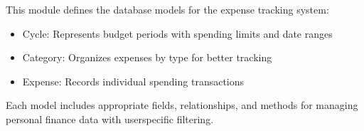 \documentclass[letterpaper,10pt,english]{sphinxmanual}
\begin{document}
\sphinxAtStartPar
This module defines the database models for the expense tracking system:
\begin{description}
\begin{itemize}
\item {} 
\sphinxAtStartPar
Cycle: Represents budget periods with spending limits and date ranges

\item {} 
\sphinxAtStartPar
Category: Organizes expenses by type for better tracking

\item {} 
\sphinxAtStartPar
Expense: Records individual spending transactions

\end{itemize}

\end{description}

\sphinxAtStartPar
Each model includes appropriate fields, relationships, and methods
for managing personal finance data with user\sphinxhyphen{}specific filtering.
\end{document}
